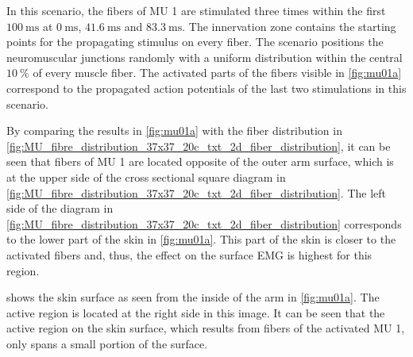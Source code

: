 In this scenario, the fibers of MU 1 are stimulated three times within the first $\SI{100}{\milli\second}$ at $\SI{0}{\milli\second}$, $\SI{41.6}{\milli\second}$ and $\SI{83.3}{\milli\second}$.  The innervation zone contains the starting points for the propagating stimulus on every fiber. The scenario positions the neuromuscular junctions randomly with a uniform distribution within the central $\SI{10}{\percent}$ of every muscle fiber. The activated parts of the fibers visible in \cref{fig:mu01a} correspond to the propagated action potentials of the last two stimulations in this scenario.

By comparing the results in \cref{fig:mu01a} with the fiber distribution in \cref{fig:MU_fibre_distribution_37x37_20c_txt_2d_fiber_distribution}, it can be seen that fibers of MU 1 are located opposite of the outer arm surface, which is at the upper side of the cross sectional square diagram in \cref{fig:MU_fibre_distribution_37x37_20c_txt_2d_fiber_distribution}. The left side of the diagram in \cref{fig:MU_fibre_distribution_37x37_20c_txt_2d_fiber_distribution} corresponds to the lower part of the skin in \cref{fig:mu01a}. This part of the skin is closer to the activated fibers and, thus, the effect on the surface EMG is highest for this region.

 shows the skin surface as seen from the inside of the arm in \cref{fig:mu01a}. The active region is located at the right side in this image.
It can be seen that the active region on the skin surface, which results from fibers of the activated MU 1, only spans a small portion of the surface.

